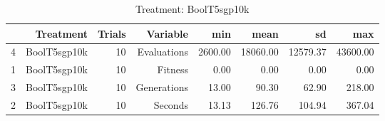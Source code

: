 \begin{table}[ht]
\centering
\begin{tabular}{rrrrrrrr}
  \hline
 & Treatment & Trials & Variable & min & mean & sd & max \\ 
  \hline
4 & BoolT5sgp10k &  10 & Evaluations & 2600.00 & 18060.00 & 12579.37 & 43600.00 \\ 
  1 & BoolT5sgp10k &  10 & Fitness & 0.00 & 0.00 & 0.00 & 0.00 \\ 
  3 & BoolT5sgp10k &  10 & Generations & 13.00 & 90.30 & 62.90 & 218.00 \\ 
  2 & BoolT5sgp10k &  10 & Seconds & 13.13 & 126.76 & 104.94 & 367.04 \\ 
   \hline
\end{tabular}
\caption{Treatment: BoolT5sgp10k} 
\end{table}
